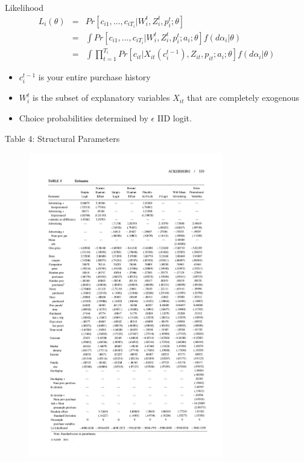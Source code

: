\documentclass[xcolor=pdftex,dvipsnames,table,mathserif,aspectratio=169]{beamer}
\begin{document}
\begin{frame}{Likelihood}
\begin{eqnarray*}
L_i(\theta) &=& Pr[c_{i1},\ldots,c_{iT_i} | W_i^t, Z_i^t, p_i^t; \theta] \\
&=& \int Pr[c_{i1},\ldots,c_{iT_i} | W_i^t, Z_i^t, p_i^t; a_i;  \theta] f(d \alpha_i | \theta)\\
&=& \int \prod_{t=1}^{T_i} Pr[c_{it}|  X_{it}(c_{i}^{t-1}), Z_{it}, p_{it}; a_i;  \theta] f(d \alpha_i | \theta)
\end{eqnarray*}
\begin{itemize}
\item $c_{i}^{t-1}$ is your entire purchase history
\item $W_{i}^t$ is the subset of explanatory variables $X_{it}$ that are completely exogenous
\item Choice probabilities determined by $\epsilon$ IID logit.
\end{itemize}
\end{frame}

\begin{frame}{Table 4: Structural Parameters}
\begin{figure}[htbp]
\begin{center}
\includegraphics[width=8.5cm]{resources/acker4.pdf}
\label{default}
\end{center}
\end{figure}
\end{frame}
\end{document}
